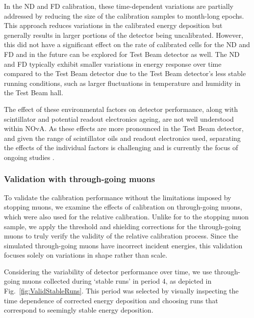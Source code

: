 In the \gls{ND} and \gls{FD} calibration, these time-dependent variations are partially addressed by reducing the size of the calibration samples to month-long epochs. This approach reduces variations in the calibrated energy deposition but generally results in larger portions of the detector being uncalibrated. However, this did not have a significant effect on the rate of calibrated cells for the \gls{ND} and \gls{FD} \cite{NOvA-doc-60838} and in the future can be explored for Test Beam detector as well. The \gls{ND} and \gls{FD} typically exhibit smaller variations in energy response over time compared to the Test Beam detector due to the Test Beam detector's less stable running conditions, such as larger fluctuations in temperature and humidity in the Test Beam hall.

The effect of these environmental factors on detector performance, along with scintillator and potential readout electronics ageing, are not well understood within \gls{NOvA}. As these effects are more pronounced in the Test Beam detector, and given the range of scintillator oils and readout electronics used, separating the effects of the individual factors is challenging and is currently the focus of ongoing studies \cite{NOvA-doc-59591}.

\subsubsection{Validation with through-going muons}
To validate the calibration performance without the limitations imposed by stopping muons, we examine the effects of calibration on through-going muons, which were also used for the relative calibration. Unlike for to the stopping muon sample, we apply the threshold and shielding corrections for the through-going muons to truly verify the validity of the relative calibration process. Since the simulated through-going muons have incorrect incident energies, this validation focuses solely on variations in shape rather than scale.

Considering the variability of detector performance over time, we use through-going muons collected during `stable runs' in period 4, as depicted in Fig.~\ref{fig:ValidStableRuns}. This period was selected by visually inspecting the time dependence of corrected energy deposition and choosing runs that correspond to seemingly stable energy deposition.

